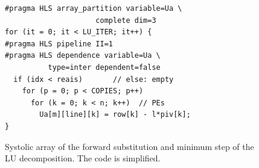 \begin{figure}[!ht]
\caption{Systolic array of the forward substitution and minimum step of the LU decomposition. The code is simplified.}
\label{fig:hw-sistolico}
\vspace{4pt}
\centering
\begin{minipage}[c]{0.62\textwidth}
\fontsize{8}{9.6}\selectfont
\begin{verbatim}
#pragma HLS array_partition variable=Ua \
                     complete dim=3
for (it = 0; it < LU_ITER; it++) {
#pragma HLS pipeline II=1
#pragma HLS dependence variable=Ua \
          type=inter dependent=false
  if (idx < reais)       // else: empty
    for (p = 0; p < COPIES; p++)
      for (k = 0; k < n; k++)  // PEs
        Ua[m][line][k] = row[k] - l*piv[k];
}
\end{verbatim}
\end{minipage}


\end{figure}
